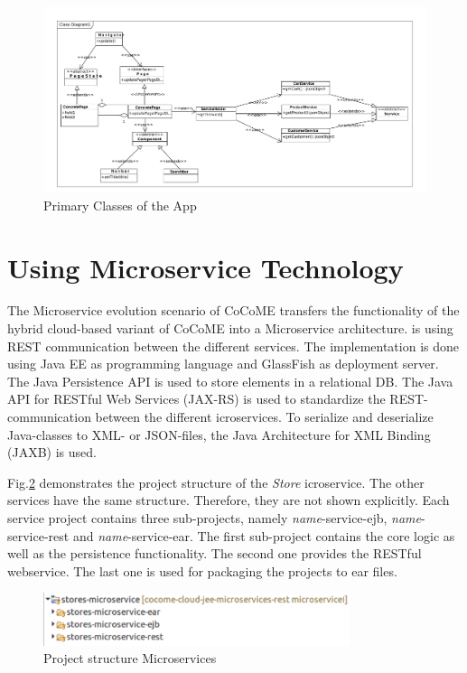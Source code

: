   
   \begin{figure}
  	\includegraphics[width=\textwidth]{img/appBasicClass.pdf}
  	\caption{Primary Classes of the App}
  	\label{App_ClassDiagram}
  \end{figure}

\FloatBarrier
 
 
 \section{Using Microservice Technology} \label{MicroserviceImplementation}
 The Microservice evolution scenario of CoCoME transfers the functionality of the hybrid cloud-based variant of CoCoME into a Microservice architecture.
  is using REST communication between the different services. 
 The implementation is done using Java EE as programming language and GlassFish as deployment server. 
 The Java Persistence API is used to store elements in a relational DB. 
 The Java API for RESTful Web Services (JAX-RS) is used to standardize the REST-communication between the different icroservices. 
 To serialize and deserialize Java-classes to XML- or JSON-files, the Java Architecture for XML Binding (JAXB) is used. 

 Fig.\added{~}\ref{projectStructure} demonstrates the project structure of the \textit{Store} icroservice. 
 The other services have the same structure. 
 Therefore, they are not shown explicitly.  
 Each service project contains three sub-projects, namely \textit{name}-service-ejb, \textit{name}-service-rest and \textit{name}-service-ear. 
 The first sub-project contains the core logic as well as the persistence functionality. 
 The second one provides the RESTful webservice. 
 The last one is used for packaging the projects to ear files. 
 
 
 

 
	\begin{figure}[h]
		\centering
		\includegraphics[width = 0.8\textwidth] {img/projectStructure_Micro.pdf}
	 	\caption{Project structure Microservices}
	 	\label{projectStructure}
	 	
 	\end{figure}
 	
